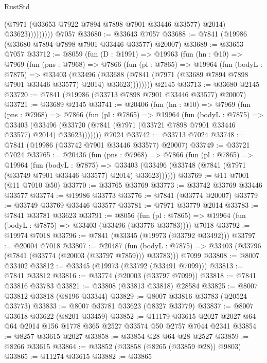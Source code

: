 \begin{lexlean}{RustStd}
\begin{coremodule}
                      (@7971 (@33653 @7922 @7894 @7898 @7901 @33446 @33577) @2014)
                      @33623)))))))))
    @7057
@33680 := @33643 @7057
@33688 := @7841 (@19986 (@33680 @7894 @7898 @7901 @33446 @33577) @20007)
@33689 := @33653 @7057
@33712 := @8059
    (fun (D : @1991) =>
    @19963
      (fun (hn : @10) =>
      @7969
        (fun (pns : @7968) =>
        @7866
          (fun (pl : @7865) =>
          @19964
            (fun (bodyL : @7875) =>
            @33403
              (@33496
                (@33688 (@7841 (@7971 (@33689 @7894 @7898 @7901 @33446 @33577) @2014) @33623))))))))
    @2145
@33713 := @33680 @2145
@33720 := @7841 (@19986 (@33713 @7898 @7901 @33446 @33577) @20007)
@33721 := @33689 @2145
@33741 := @20406
    (fun (hn : @10) =>
    @7969
      (fun (pns : @7968) =>
      @7866
        (fun (pl : @7865) =>
        @19964
          (fun (bodyL : @7875) =>
          @33403
            (@33496 (@33720 (@7841 (@7971 (@33721 @7898 @7901 @33446 @33577) @2014) @33623)))))))
    @7024
@33742 := @33713 @7024
@33748 := @7841 (@19986 (@33742 @7901 @33446 @33577) @20007)
@33749 := @33721 @7024
@33765 := @20436
    (fun (pns : @7968) =>
    @7866
      (fun (pl : @7865) =>
      @19964
        (fun (bodyL : @7875) =>
        @33403 (@33496 (@33748 (@7841 (@7971 (@33749 @7901 @33446 @33577) @2014) @33623))))))
@33769 := @11 @7001 (@11 @7010 @50)
@33770 := @33765 @33769
@33773 := @33742 @33769 @33446 @33577
@33774 := @19986 @33773
@33776 := @7841 (@33774 @20007)
@33779 := @33749 @33769 @33446 @33577
@33781 := @7971 @33779 @2014
@33783 := @7841 @33781 @33623
@33791 := @8056
    (fun (pl : @7865) => @19964 (fun (bodyL : @7875) => @33403 (@33496 (@33776 @33783))))
    @7018
@33792 := @19974 @7018
@33796 := @7841 (@33345 (@19973 (@33792 @33492)))
@33797 := @20004 @7018
@33807 := @20487
    (fun (bodyL : @7875) => @33403 (@33796 (@7841 (@33774 (@20003 (@33797 @7859))) @33783)))
    @7099
@33808 := @8007 @33402
@33812 := @33345 (@19973 (@33792 (@33491 @7099)))
@33813 := @7841 @33812
@33816 := @33774 (@20003 (@33797 @7099))
@33818 := @7841 @33816 @33783
@33821 := @33808 (@33813 @33818) @28584
@33825 := @8007 @33812 @33818 (@8196 @33344)
@33829 := @8007 @33816 @33783 (@20524 @33773)
@33833 := @8007 @33781 @33623 (@8327 @33779)
@33837 := @8007 @33618 @33622 (@8201 @33459)
@33852 := @11179 @33615 @2027 @2027 @64 @64 @2014 @156 @1778 @365 @2527 @33574 @50 @2757 @7044 @2341
@33854 := @8257 @33615 @2027
@33858 := @33854 @28 @64 @28 @2527
@33859 := @8266 @33615
@33864 := @33852 (@33858 (@8265 (@33859 @28)) @9803)
@33865 := @11274 @33615
@33882 := @33865

\end{coremodule}
\end{lexlean}
